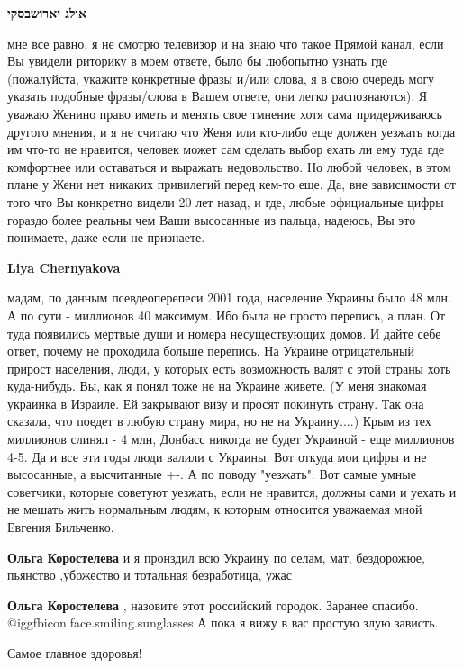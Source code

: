 \begin{itemize}
\begin{itemize}
\textbf{אולג יארושבסקי} 

мне все равно, я не смотрю телевизор и на знаю что такое Прямой канал, если Вы
увидели риторику в моем ответе, было бы любопытно узнать где (пожалуйста,
укажите конкретные фразы и/или слова, я в свою очередь могу указать подобные
фразы/слова в Вашем ответе, они легко распознаются). Я уважаю Женино право
иметь и менять свое тмнение хотя сама придерживаюсь другого мнения, и я не
считаю что Женя или кто-либо еще должен уезжать когда им что-то не нравится,
человек может сам сделать выбор ехать ли ему туда где комфортнее или оставаться
и выражать недовольство. Но любой человек, в этом плане у Жени нет никаких
привилегий перед кем-то еще. Да, вне зависимости от того что Вы конкретно
видели 20 лет назад, и где, любые официальные цифры гораздо более реальны чем
Ваши высосанные из пальца, надеюсь, Вы это понимаете, даже если не признаете.

\textbf{Liya Chernyakova} 

мадам, по данным псевдеоперепеси 2001 года, население Украины было 48 млн. А по
сути - миллионов 40 максимум. Ибо была не просто перепись, а план. От туда
появились мертвые души и номера несуществующих домов. И дайте себе ответ,
почему не проходила больше перепись. На Украине отрицательный прирост
населения, люди, у которых есть возможность валят с этой страны хоть
куда-нибудь. Вы, как я понял тоже не на Украине живете. (У меня знакомая
украинка в Израиле. Ей закрывают визу и просят покинуть страну. Так она
сказала, что поедет в любую страну мира, но не на Украину....) Крым из тех
миллионов слинял - 4 млн, Донбасс никогда не будет Украиной - еще миллионов
4-5. Да и все эти годы люди валили с Украины. Вот откуда мои цифры и не
высосанные, а высчитанные +-. А по поводу "уезжать": Вот самые умные советчики,
которые советуют уезжать, если не нравится, должны сами и уехать и не мешать
жить нормальным людям, к которым относится уважаемая мной Евгения Бильченко.


\textbf{Ольга Коростелева} и я пронздил всю Украину по селам, мат, бездорожюе, пьянство ,убожество и тотальная безработица, ужас

\textbf{Ольга Коростелева} , назовите этот российский городок. Заранее спасибо. @igg{fbicon.face.smiling.sunglasses} 
А пока я вижу в вас простую злую зависть.

\end{itemize} %

Самое главное здоровья!


\end{itemize}
